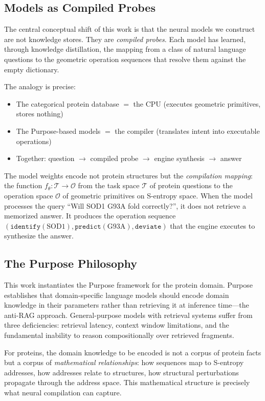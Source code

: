 \documentclass[11pt,twocolumn,a4paper]{article}
\theoremstyle{definition}
\theoremstyle{remark}
\newcommand{\params}{\theta}
\newcommand{\taskspace}{\mathcal{T}}
\newcommand{\opspace}{\mathcal{O}}
\begin{document}
\subsection{Models as Compiled Probes}

The central conceptual shift of this work is that the neural models we construct are not knowledge stores. They are \emph{compiled probes}. Each model has learned, through knowledge distillation, the mapping from a class of natural language questions to the geometric operation sequences that resolve them against the empty dictionary.

The analogy is precise:
\begin{itemize}
    \item The categorical protein database $=$ the CPU (executes geometric primitives, stores nothing)
    \item The Purpose-based models $=$ the compiler (translates intent into executable operations)
    \item Together: question $\to$ compiled probe $\to$ engine synthesis $\to$ answer
\end{itemize}

The model weights encode not protein structures but the \emph{compilation mapping}: the function $f_\params: \taskspace \to \opspace$ from the task space $\taskspace$ of protein questions to the operation space $\opspace$ of geometric primitives on S-entropy space. When the model processes the query ``Will SOD1 G93A fold correctly?'', it does not retrieve a memorized answer. It produces the operation sequence $(\texttt{identify}(\text{SOD1}), \texttt{predict}(\text{G93A}), \texttt{deviate})$ that the engine executes to synthesize the answer.

\subsection{The Purpose Philosophy}

This work instantiates the Purpose framework \citep{purpose2024} for the protein domain. Purpose establishes that domain-specific language models should encode domain knowledge in their parameters rather than retrieving it at inference time---the anti-RAG approach. General-purpose models with retrieval systems suffer from three deficiencies: retrieval latency, context window limitations, and the fundamental inability to reason compositionally over retrieved fragments.

For proteins, the domain knowledge to be encoded is not a corpus of protein facts but a corpus of \emph{mathematical relationships}: how sequences map to S-entropy addresses, how addresses relate to structures, how structural perturbations propagate through the address space. This mathematical structure is precisely what neural compilation can capture.
\end{document}
